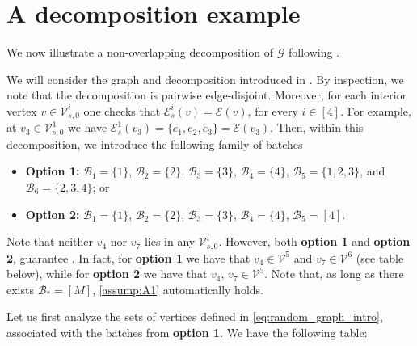 \documentclass[10pt,a4paper]{amsart}
\begin{document}
	
\section{A decomposition example}\label{sec:example_decomp}

We now illustrate a non-overlapping decomposition of $\mathcal{G}$ following .

\smallbreak
{} 
We will consider the graph and decomposition introduced in .  By inspection, we note that the decomposition is pairwise edge-disjoint. Moreover, for each interior vertex $v\in\mathcal{V}_{s,0}^i$ one checks that $\mathcal{E}^i_s(v)=\mathcal{E}(v)$, for every $i\in[4]$. For example, at $v_3\in\mathcal{V}_{s,0}^1$ we have  $\mathcal{E}^1_s(v_3) = \{e_1,e_2,e_3\} = \mathcal{E}(v_3)$. Then, within this decomposition, we introduce the following family of batches
\begin{itemize}
    \item {\bf Option 1:} $\mathcal{B}_{1} = \{1\}$, $\mathcal{B}_{2} = \{2\}$, $\mathcal{B}_{3} = \{3\}$, $\mathcal{B}_{4} = \{4\}$, $\mathcal{B}_{5} = \{1,2,3\}$, and $\mathcal{B}_{6} = \{2,3,4\}$; or
    \item {\bf Option 2:} $\mathcal{B}_{1} = \{1\}$, $\mathcal{B}_{2} = \{2\}$, $\mathcal{B}_{3} = \{3\}$, $\mathcal{B}_{4} = \{4\}$, $\mathcal{B}_5=[4]$.
\end{itemize}
Note that neither $v_4$ nor $v_7$ lies in any $\mathcal{V}_{s,0}^i$. However, both {\bf option 1} and  {\bf option 2}, guarantee . In fact, for {\bf option 1} we have that $v_4\in \mathcal{V}^5$ and $v_7\in \mathcal{V}^6$ (see table below), while for {\bf option 2} we have that $v_4,\,v_7\in \mathcal{V}^5$. Note that, as long as there exists $\mathcal{B}_* =[M]$, \cref{assump:A1} automatically holds.
\medbreak



 Let us first analyze the sets of vertices defined in \eqref{eq:random_graph_intro}, associated with the batches from {\bf option 1}. We have the following table:
\end{document}
